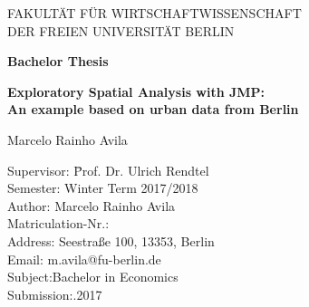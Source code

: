\thispagestyle{empty}

\begin{center}

\vspace*{-10mm}

{\LARGE FAKULTÄT FÜR WIRTSCHAFTWISSENSCHAFT \\}
{\LARGE DER FREIEN UNIVERSITÄT BERLIN\\}

\vspace*{3cm}



{\Large \textbf{Bachelor Thesis}}\\ 

\vspace{2cm}

{\Large \textbf{Exploratory Spatial Analysis with JMP:}}\\ 
\vspace*{2mm}
{\Large \textbf{An example based on urban data from Berlin}}\\ 



\vspace{2cm}

{\LARGE Marcelo Rainho Avila}\\[15mm]

\vspace{2cm}

\parbox{120mm}{
\begin{large}
\begin{tabbing}
Supervisor: \hspace{2cm} \=Prof. Dr. Ulrich Rendtel\\[1.5mm]
Semester:\> Winter Term 2017/2018\\[1.5mm]
Author:\> Marcelo Rainho Avila\\[1.5mm] %
Matriculation-Nr.:\\[1.5mm]
Address:\> Seestraße 100, 13353, Berlin\\[1.5mm]
Email:\> m.avila@fu-berlin.de\\[1.5mm]
Subject:\>Bachelor in Economics\\[1.5mm]
Submission:.2017  \\[1.5mm] 
\end{tabbing}
\end{large}
}
\end{center}
\clearpage{\pagestyle{empty}\cleardoublepage}